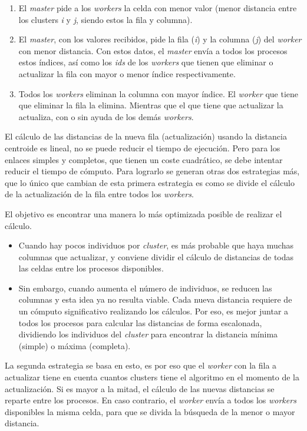 		\begin{enumerate}
			\item El \textit{master} pide a los \textit{workers} la celda con menor valor (menor distancia entre los clusters \textit{i} y \textit{j}, siendo estos la fila y columna). 
			\item El \textit{master}, con los valores recibidos, pide la fila (\textit{i}) y la columna (\textit{j}) del \textit{worker} con menor distancia. Con estos datos, el \textit{master} envía a todos los procesos estos índices, así como los \textit{ids} de los \textit{workers} que tienen que eliminar o actualizar la fila con mayor o menor índice respectivamente.
			\item Todos los \textit{workers} eliminan la columna con mayor índice. El \textit{worker} que tiene que eliminar la fila la elimina. Mientras que el que tiene que actualizar la actualiza, con o sin ayuda de los demás \textit{workers}.
		\end{enumerate}
								
		
		El cálculo de las distancias de la nueva fila (actualización) usando la distancia centroide es lineal, no se puede reducir el tiempo de ejecución. Pero para los enlaces simples y completos, que tienen un coste cuadrático, se debe intentar reducir el tiempo de cómputo. Para lograrlo se generan otras dos estrategias más, que lo único que cambian de esta primera estrategia es como se divide el cálculo de la actualización de la fila entre todos los \textit{workers}. 
		
		El objetivo es encontrar una manera lo más optimizada posible de realizar el cálculo. 
		\begin{itemize}
			\item Cuando hay pocos individuos por \textit{cluster}, es más probable que haya muchas columnas que actualizar, y conviene dividir el cálculo de distancias de todas las celdas entre los procesos disponibles. 
			\item Sin embargo, cuando aumenta el número de individuos, se reducen las columnas y esta idea ya no resulta viable. Cada nueva distancia requiere de un cómputo significativo realizando los cálculos. Por eso, es mejor juntar a todos los procesos para calcular las distancias de forma escalonada, dividiendo los individuos del \textit{cluster} para encontrar la distancia mínima (simple) o máxima (completa).
		\end{itemize}
		
		La segunda estrategia se basa en esto, es por eso que el \textit{worker} con la fila a actualizar tiene en cuenta cuantos clusters tiene el algoritmo en el momento de la actualización. Si es mayor a la mitad, el cálculo de las nuevas distancias se reparte entre los procesos. En caso contrario, el \textit{worker} envía a todos los \textit{workers} disponibles la misma celda, para que se divida la búsqueda de la menor o mayor distancia.
		

